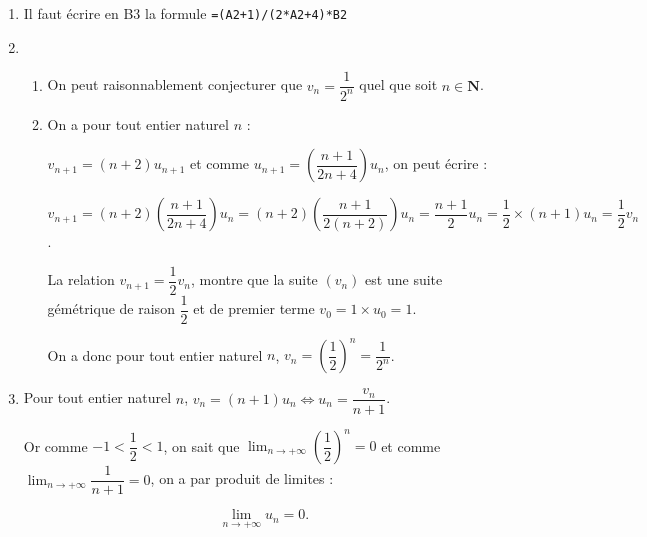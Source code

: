 \documentclass[12pt,a4paper,french]{article}
\newcommand{\N}{\mathbf{N}}
\begin{document}
\begin{solution}
  \begin{enumerate}
    \item Il faut écrire en B3 la formule \texttt{=(A2+1)/(2*A2+4)*B2}
\item  
	\begin{enumerate}
		\item %
On peut raisonnablement conjecturer que $v_n = \dfrac{1}{2^n}$ quel que soit $n \in \N$.
		\item %
On a pour tout entier naturel $n$ :
		
$v_{n+1} = (n + 2)u_{n+1}$ et comme $u_{n+1} =\left(\dfrac{n+1}{2n+4}\right) u_n$, on peut écrire :
		
$v_{n+1} = (n + 2)\left(\dfrac{n+1}{2n+4}\right) u_n = (n + 2)\left(\dfrac{n+1}{2(n+2)}\right) u_n = \dfrac{n + 1}{2}u_n =  \dfrac{1}{2}\times (n + 1)u_n = \dfrac{1}{2}v_n$.

La relation $v_{n+1} = \dfrac{1}{2}v_n$, montre que la suite $\left(v_n\right)$ est une suite gémétrique de raison $\dfrac{1}{2}$ et de premier terme $v_0 = 1 \times u_0 = 1$.

On a donc pour tout entier naturel $n$, \: $v_n = \left(\dfrac{1}{2} \right)^n = \dfrac{1}{2^n}$.		
	\end{enumerate}
\item  %
Pour tout entier naturel $n$, \: $v_n = (n + 1)u_n \iff u_n = \dfrac{v_n}{n+1}$.

Or comme $-1 < \dfrac{1}{2} < 1$, on sait que $\displaystyle\lim_{n \to + \infty}\left(\dfrac{1}{2} \right)^n = 0$ et comme $\displaystyle\lim_{n \to + \infty}\dfrac{1}{n + 1} = 0$, on a par produit de limites :

\[\displaystyle\lim_{n \to + \infty} u_n = 0.\]
\end{enumerate}
\end{solution}

\newpage


\bigskip

\printsolutions
\end{document}

